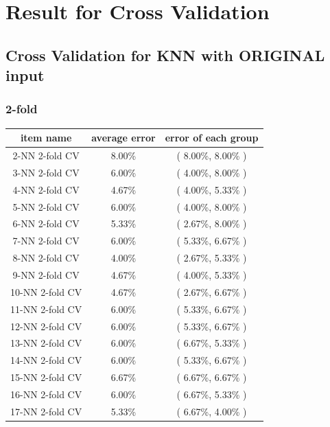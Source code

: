 \documentclass[11pt,a4paper]{article}
\begin{document}
\newpage

\section{Result for Cross Validation}
\subsection{Cross Validation for KNN with ORIGINAL input}
\hypertarget{twoFoldResultunNorm}{}
\subsubsection{2-fold}
\begin{center}
    \begin{tabular} {|| c | c | c ||}
        \hline
        item name & average error & error of each group \\ \hline
        2-NN 2-fold CV & 8.00\% & ( 8.00\%, 8.00\% )\\ \hline
        3-NN 2-fold CV & 6.00\% & ( 4.00\%, 8.00\% )\\ \hline
        4-NN 2-fold CV & 4.67\% & ( 4.00\%, 5.33\% )\\ \hline
        5-NN 2-fold CV & 6.00\% & ( 4.00\%, 8.00\% )\\ \hline
        6-NN 2-fold CV & 5.33\% & ( 2.67\%, 8.00\% )\\ \hline
        7-NN 2-fold CV & 6.00\% & ( 5.33\%, 6.67\% )\\ \hline
        8-NN 2-fold CV & 4.00\% & ( 2.67\%, 5.33\% )\\ \hline
        9-NN 2-fold CV & 4.67\% & ( 4.00\%, 5.33\% )\\ \hline
        10-NN 2-fold CV & 4.67\% & ( 2.67\%, 6.67\% )\\ \hline
        11-NN 2-fold CV & 6.00\% & ( 5.33\%, 6.67\% )\\ \hline
        12-NN 2-fold CV & 6.00\% & ( 5.33\%, 6.67\% )\\ \hline
        13-NN 2-fold CV & 6.00\% & ( 6.67\%, 5.33\% )\\ \hline
        14-NN 2-fold CV & 6.00\% & ( 5.33\%, 6.67\% )\\ \hline
        15-NN 2-fold CV & 6.67\% & ( 6.67\%, 6.67\% )\\ \hline
        16-NN 2-fold CV & 6.00\% & ( 6.67\%, 5.33\% )\\ \hline
        17-NN 2-fold CV & 5.33\% & ( 6.67\%, 4.00\% )\\ \hline

\end{tabular}
\end{center}
\end{document}
